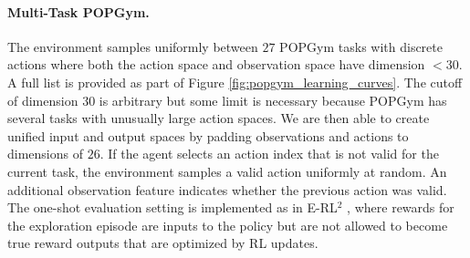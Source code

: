 \paragraph{Multi-Task POPGym.} The environment samples uniformly between $27$ POPGym \cite{morad2023popgym} tasks with discrete actions where both the action space and observation space have dimension $< 30$. A full list is provided as part of Figure \ref{fig:popgym_learning_curves}. The cutoff of dimension $30$ is arbitrary but some limit is necessary because POPGym has several tasks with unusually large action spaces. We are then able to create unified input and output spaces by padding observations and actions to dimensions of $26$. If the agent selects an action index that is not valid for the current task, the environment samples a valid action uniformly at random. An additional observation feature indicates whether the previous action was valid. The one-shot evaluation setting is implemented as in E-RL$^2$ \cite{stadie2018some}, where rewards for the exploration episode are inputs to the policy but are not allowed to become true reward outputs that are optimized by RL updates.

